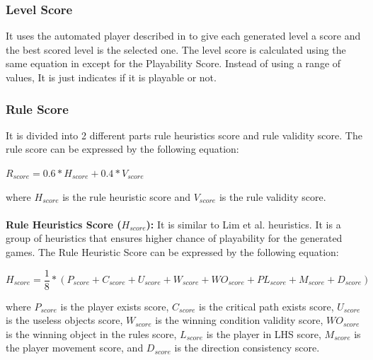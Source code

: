 \subsubsection{Level Score}
It uses the automated player described in  to give each generated level a score and the best scored level is the selected one. The level score is calculated using the same equation in  except for the Playability Score. Instead of using a range of values, It is just indicates if it is playable or not.

\subsubsection{Rule Score}
It is divided into 2 different parts rule heuristics score and rule validity score. The rule score can be expressed by the following equation:
\begin{center}
$R_{score} = 0.6 * H_{score} + 0.4 * V_{score}$
\end{center}
where $H_{score}$ is the rule heuristic score and $V_{score}$ is the rule validity score.\\\\
\textbf{Rule Heuristics Score ($H_{score}$):} It is similar to Lim et al.\cite{puzzleScriptGeneration} heuristics. It is a group of heuristics that ensures higher chance of playability for the generated games. The Rule Heuristic Score can be expressed by the following equation:
\begin{center}
$H_{score} = \dfrac{1}{8} * (P_{score} + C_{score} + U_{score} + W_{score} + WO_{score} + PL_{score} + M_{score} + D_{score})$
\end{center}
where $P_{score}$ is the player exists score, $C_{score}$ is the critical path exists score, $U_{score}$ is the useless objects score, $W_{score}$ is the winning condition validity score, $WO_{score}$ is the winning object in the rules score, $L_{score}$ is the player in LHS score, $M_{score}$ is the player movement score, and $D_{score}$ is the direction consistency score.
